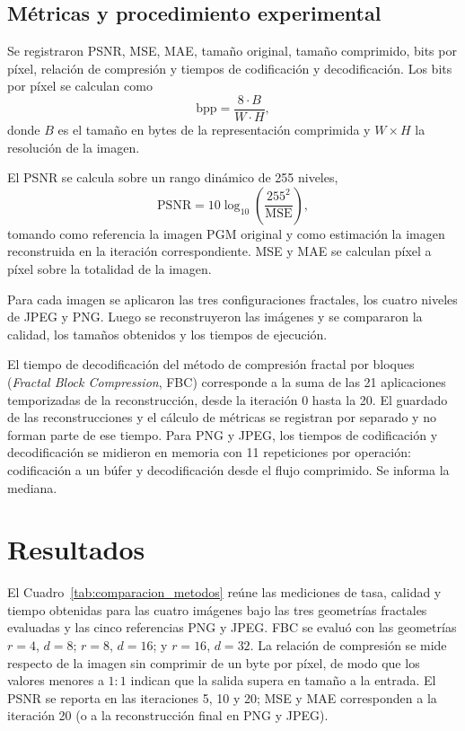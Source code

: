 \documentclass[a4paper]{llncs}
\begin{document}
\subsection{Métricas y procedimiento experimental}

Se registraron PSNR, MSE, MAE, tamaño original, tamaño comprimido, bits por píxel, relación de compresión y tiempos de codificación y decodificación. Los bits por píxel se calculan como
\[
\mathrm{bpp} = \frac{8 \cdot B}{W \cdot H},
\]
donde $B$ es el tamaño en bytes de la representación comprimida y $W \times H$ la resolución de la imagen.

El PSNR se calcula sobre un rango dinámico de 255 niveles,
\[
\mathrm{PSNR} = 10 \log_{10}\!\left(\frac{255^{2}}{\mathrm{MSE}}\right),
\]
tomando como referencia la imagen PGM original y como estimación la imagen reconstruida en la iteración correspondiente. MSE y MAE se calculan píxel a píxel sobre la totalidad de la imagen.

Para cada imagen se aplicaron las tres configuraciones fractales, los cuatro niveles de JPEG y PNG. Luego se reconstruyeron las imágenes y se compararon la calidad, los tamaños obtenidos y los tiempos de ejecución.

El tiempo de decodificación del método de compresión fractal por bloques (\emph{Fractal Block Compression}, FBC) corresponde a la suma de las 21 aplicaciones temporizadas de la reconstrucción, desde la iteración 0 hasta la 20. El guardado de las reconstrucciones y el cálculo de métricas se registran por separado y no forman parte de ese tiempo. Para PNG y JPEG, los tiempos de codificación y decodificación se midieron en memoria con 11 repeticiones por operación: codificación a un búfer y decodificación desde el flujo comprimido. Se informa la mediana.

\section{Resultados}
\label{sec:resultados}

El Cuadro~\ref{tab:comparacion_metodos} reúne las mediciones de tasa, calidad y tiempo obtenidas para las cuatro imágenes bajo las tres geometrías fractales evaluadas y las cinco referencias PNG y JPEG. FBC se evaluó con las geometrías $r{=}4$, $d=8$; $r{=}8$, $d=16$; y $r{=}16$, $d=32$. La relación de compresión se mide respecto de la imagen sin comprimir de un byte por píxel, de modo que los valores menores a $1{:}1$ indican que la salida supera en tamaño a la entrada. El PSNR se reporta en las iteraciones 5, 10 y 20; MSE y MAE corresponden a la iteración 20 (o a la reconstrucción final en PNG y JPEG).
\end{document}
